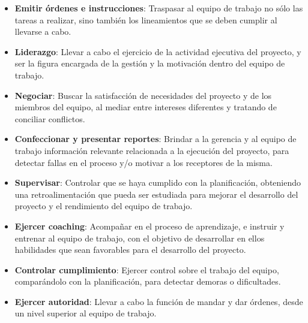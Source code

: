 \begin{itemize}
                \item \textbf{Emitir órdenes e instrucciones}:
                Traspasar al equipo de trabajo no sólo las tareas a realizar, sino también los lineamientos que se deben cumplir al llevarse a cabo.
                
                \item \textbf{Liderazgo}:
                Llevar a cabo el ejercicio de la actividad ejecutiva del proyecto, y ser la figura encargada de la gestión y la motivación dentro del equipo de trabajo.
                
                \item \textbf{Negociar}:
                Buscar la satisfacción de necesidades del proyecto y de los miembros del equipo, al mediar entre intereses diferentes y tratando de conciliar conflictos.
                
                \item \textbf{Confeccionar y presentar reportes}:
                Brindar a la gerencia y al equipo de trabajo información relevante relacionada a la ejecución del proyecto, para detectar fallas en el proceso y/o motivar a los receptores de la misma.
                
                \item \textbf{Supervisar}:
                Controlar que se haya cumplido con la planificación, obteniendo una retroalimentación que pueda ser estudiada para mejorar el desarrollo del proyecto y el rendimiento del equipo de trabajo.
                
                \item \textbf{Ejercer coaching}:
                Acompañar en el proceso de aprendizaje, e instruir y entrenar al equipo de trabajo, con el objetivo de desarrollar en ellos habilidades que sean favorables para el desarrollo del proyecto.
                
                \item \textbf{Controlar cumplimiento}:
                Ejercer control sobre el trabajo del equipo, comparándolo con la planificación, para detectar demoras o dificultades.
                
                \item \textbf{Ejercer autoridad}:
                Llevar a cabo la función de mandar y dar órdenes, desde un nivel superior al equipo de trabajo.
            \end{itemize}
        
        
